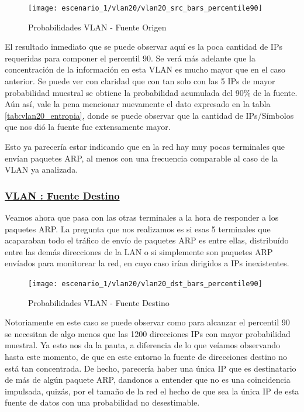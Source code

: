 \begin{figure}[!ht]
    \centering
    \texttt{[image: escenario\_1/vlan20/vlan20\_src\_bars\_percentile90]}
    \caption{Probabilidades VLAN  - Fuente Origen}
    \label{fig:vlan20_src_prob_per90}
\end{figure}

\par El resultado inmediato que se puede observar aqu\'i es la poca cantidad de IPs
requeridas para componer el percentil 90. Se ver\'a m\'as adelante que la concentraci\'on
de la informaci\'on en esta VLAN es mucho mayor que en el caso anterior. Se puede
ver con claridad que con tan solo con las 5 IPs de mayor probabilidad muestral se obtiene
la probabilidad acumulada del 90\% de la fuente. A\'un as\'i, vale la pena mencionar
nuevamente el dato expresado en la tabla \ref{tab:vlan20_entropia}, donde se puede
observar que la cantidad de IPs/S\'imbolos que nos di\'o la fuente fue extensamente
mayor.

\par Esto ya parecer\'ia estar indicando que en la red hay muy pocas terminales que
env\'ian paquetes ARP, al menos con una frecuencia comparable al caso de la VLAN
ya analizada.


\subsubsection*{\underline{VLAN : Fuente Destino}}\label{subsubsec:vlan20_dst}
\par Veamos ahora que pasa con las otras terminales a la hora de responder a los
paquetes ARP. La pregunta que nos realizamos es si esas 5 terminales que acaparaban
todo el tr\'afico de env\'io de paquetes ARP es entre ellas, distribu\'ido entre
las dem\'as direcciones de la LAN o si simplemente son paquetes ARP env\'iados para
monitorear la red, en cuyo caso ir\'ian dirigidos a IPs inexistentes.

\begin{figure}[!ht]
    \centering
    \texttt{[image: escenario\_1/vlan20/vlan20\_dst\_bars\_percentile90]}
    \caption{Probabilidades VLAN  - Fuente Destino}
    \label{fig:vlan20_dst_prob_per90}
\end{figure}

\par Notoriamente en este caso se puede observar como para alcanzar el percentil
90 se necesitan de algo menos que las 1200 direcciones IPs con mayor probabilidad
muestral. Ya esto nos da la pauta, a diferencia de lo que ve\'iamos observando
hasta este momento, de que en este entorno la fuente de direcciones destino
no est\'a tan concentrada. De hecho, parecer\'ia haber una \'unica IP que
es destinatario de m\'as de alg\'un paquete ARP, dandonos a entender que no es
una coincidencia impulsada, quiz\'as, por el tama\~no de la red el hecho de que
sea la \'unica IP de esta fuente de datos con una probabilidad no desestimable.

